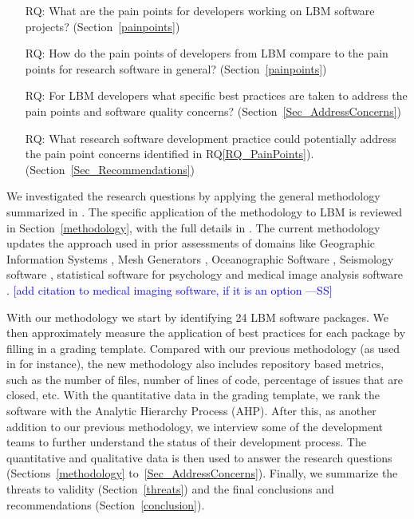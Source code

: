 \documentclass[final, 3p, times, authoryear]{elsarticle}
\newcommand{\authornote}[3]{\textcolor{#1}{[#3 ---#2]}}
\newcommand{\authornote}[3]{}
\newcommand{\wss}[1]{\authornote{blue}{SS}{#1}} %
\newcounter{rqnum} %
\newcommand{\rqref}[1]{RQ\ref{#1}}
\begin{document}
\begin{enumerate}
	\item [RQ\refstepcounter{rqnum}\therqnum \label{RQ_PainPoints}:] What are
	the pain points for developers working on LBM software projects?
	(Section~\ref{painpoints})
	\item [RQ\refstepcounter{rqnum}\therqnum \label{RQ_ComparePainPoints}:] How
	do the pain points of developers from LBM compare to the pain points
	for research software in general? (Section~\ref{painpoints})
	\item [RQ\refstepcounter{rqnum}\therqnum \label{RQ_Concerns}:] For LBM
	developers what specific best practices are taken to address the pain points
	and software quality concerns? (Section~\ref{Sec_AddressConcerns})
	\item [RQ\refstepcounter{rqnum}\therqnum \label{RQ_Recommend}:]
	What research software development practice could potentially address the
	pain point concerns identified in \rqref{RQ_PainPoints}).
	(Section~\ref{Sec_Recommendations})
\end{enumerate}

We investigated the research questions by applying the general methodology
summarized in \citet{SmithEtAl2021}.  The specific application of the
methodology to LBM is reviewed in Section~\ref{methodology}, with the full
details in \citep{Michalski2021}.  The current methodology updates the approach
used in prior assessments of domains like Geographic Information Systems
\citep{SmithEtAl2018_arXivGIS}, Mesh Generators \citep{SmithEtAl2016},
Oceanographic Software \citep{smith2015state}, Seismology software
\citep{SmithEtAl2018}, statistical software for psychology
\citep{SmithEtAl2018_StatSoft} and medical image analysis software
\citep{Dong2021}.  \wss{add citation to medical imaging software, if it is an
option}

With our methodology we start by identifying 24 LBM software packages.  We then
approximately measure the application of best practices for each package by
filling in a grading template. Compared with our previous methodology (as used
in \citep{SmithEtAl2016} for instance), the new methodology also includes
repository based metrics, such as the number of files, number of lines of code,
percentage of issues that are closed, etc.  With the quantitative data in the
grading template, we rank the software with the Analytic Hierarchy Process
(AHP). After this, as another addition to our previous methodology, we interview
some of the development teams to further understand the status of their
development process. The quantitative and qualitative data is then used to
answer the research questions (Sections~\ref{methodology}
to~\ref{Sec_AddressConcerns}).  Finally, we summarize the threats to validity
(Section~\ref{threats}) and the final conclusions and recommendations
(Section~\ref{conclusion}).
\end{document}
